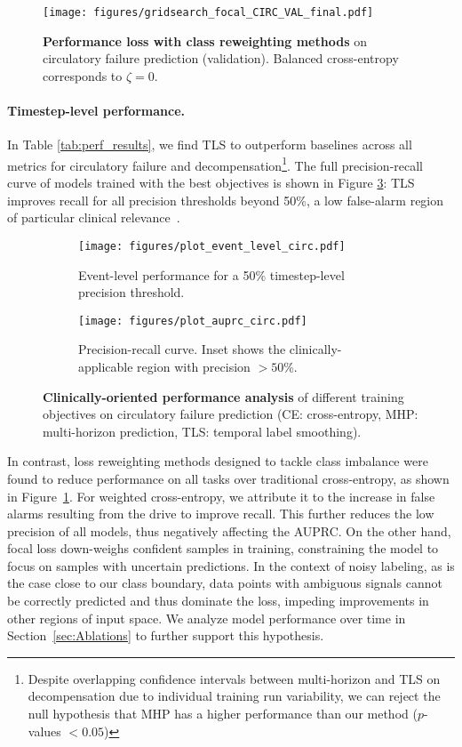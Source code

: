\documentclass[nohyperref]{article}
\begin{document}
\begin{figure}[h]
\centering
    \centering
    \texttt{[image: figures/gridsearch\_focal\_CIRC\_VAL\_final.pdf]}
\caption{\textbf{Performance loss with class reweighting methods} on circulatory failure prediction (validation). Balanced cross-entropy corresponds to $\zeta=0$.}
\label{fig:focal+weighted}
\end{figure}

\paragraph{Timestep-level performance.} In Table \ref{tab:perf_results}, we find TLS to outperform baselines across all metrics for circulatory failure and decompensation\footnote{Despite overlapping confidence intervals between multi-horizon and TLS on decompensation due to individual training run variability, we can reject the null hypothesis that MHP has a higher performance than our method ($p$-values $< 0.05$)}. The full precision-recall curve of models trained with the best objectives is shown in Figure \ref{fig:PR_curve}: TLS improves recall for all precision thresholds beyond 50\%, a low false-alarm region of particular clinical relevance~\citep{sutton2020}.

\begin{figure*}[t]
\centering
\begin{subfigure}[b]{0.46\textwidth}
  \centering
  \texttt{[image: figures/plot\_event\_level\_circ.pdf]}
  \caption{\centering Event-level performance for a 50\% timestep-level precision threshold.} \label{fig:event-based}
\end{subfigure}
\begin{subfigure}[b]{0.46\textwidth}
 \centering
  \texttt{[image: figures/plot\_auprc\_circ.pdf]}
  \caption{\centering Precision-recall curve. Inset shows the clinically-applicable region with precision $>50$\%.}
  \label{fig:PR_curve}
\end{subfigure}
\caption{\textbf{Clinically-oriented performance analysis} of different training objectives on circulatory failure prediction (CE: cross-entropy, MHP: multi-horizon prediction, TLS: temporal label smoothing).}

\label{fig:clinical_performance_circ}
\end{figure*}

In contrast, loss reweighting methods designed to tackle class imbalance were found to reduce performance on all tasks over traditional cross-entropy, as shown in Figure~\ref{fig:focal+weighted}. For weighted cross-entropy, we attribute it to the increase in false alarms resulting from the drive to improve recall. This further reduces the low precision of all models, thus negatively affecting the AUPRC. On the other hand, focal loss down-weighs confident samples in training, constraining the model to focus on samples with uncertain predictions. In the context of noisy labeling, as is the case close to our class boundary, data points with ambiguous signals cannot be correctly predicted and thus dominate the loss, impeding improvements in other regions of input space. We analyze model performance over time in Section~\ref{sec:Ablations} to further support this hypothesis.
\end{document}
